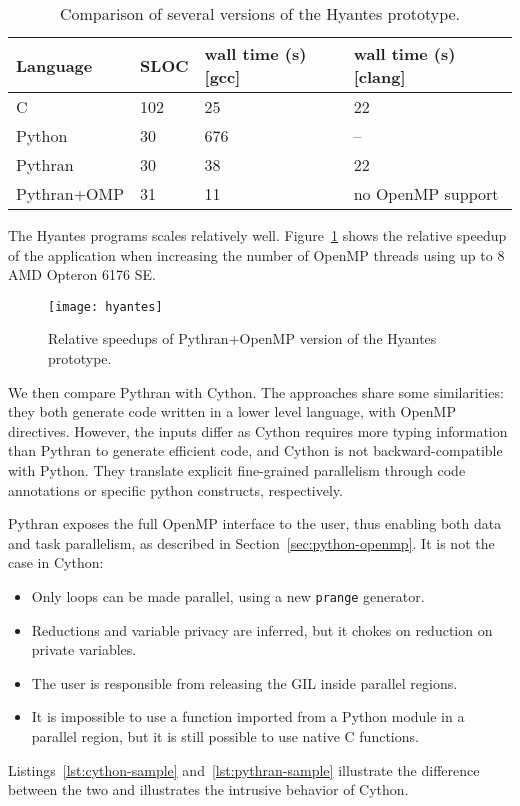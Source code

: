 \documentclass{llncs}
\begin{document}
\begin{table}

    \caption{Comparison of several versions of the Hyantes prototype.}
    \label{tbl:hyantes}

    \centering
    \begin{tabular}{|l|l|l|l|}
        \hline
        Language & SLOC & wall time (s) [gcc] & wall time (s) [clang]\\
        \hline
        C       & 102   & 25 & 22 \\
        Python  & 30    & 676 & --\\
        Pythran & 30    & 38 &  22 \\
        Pythran+OMP    & 31    & 11 & no OpenMP support\\
        \hline
    \end{tabular}

\end{table}

The Hyantes programs scales relatively well. Figure~\ref{fig:hyantes-speedup} shows
the relative speedup of the application when increasing the number of OpenMP
threads using up to 8 AMD Opteron 6176 SE.

\begin{figure}[ht]
    \caption{Relative speedups of Pythran+OpenMP version of the Hyantes prototype.}
    \label{fig:hyantes-speedup}
    \centering
    \texttt{[image: hyantes]}
\end{figure}

We then compare Pythran with Cython. The approaches share some similarities:
they both generate code written in a lower level language, with OpenMP
directives. However, the inputs differ as Cython requires more typing
information than Pythran to generate efficient code, and Cython is not
backward-compatible with Python. They translate explicit fine-grained
parallelism through code annotations or specific python constructs,
respectively.

Pythran exposes the full OpenMP interface to the user, thus enabling both data
and task parallelism, as described in Section~\ref{sec:python-openmp}. It is
not the case in Cython:
%
\begin{itemize}

    \item Only loops can be made parallel, using a new \texttt{prange} generator.

    \item Reductions and variable privacy are inferred, but it chokes on
        reduction on private variables.

    \item The user is responsible from releasing the GIL inside parallel
        regions.

    \item It is impossible to use a function imported from a Python module in a
        parallel region, but it is still possible to use native C functions.

\end{itemize}
%
Listings~\ref{lst:cython-sample} and~\ref{lst:pythran-sample} illustrate the
difference between the two and illustrates the intrusive behavior of Cython.
\end{document}
